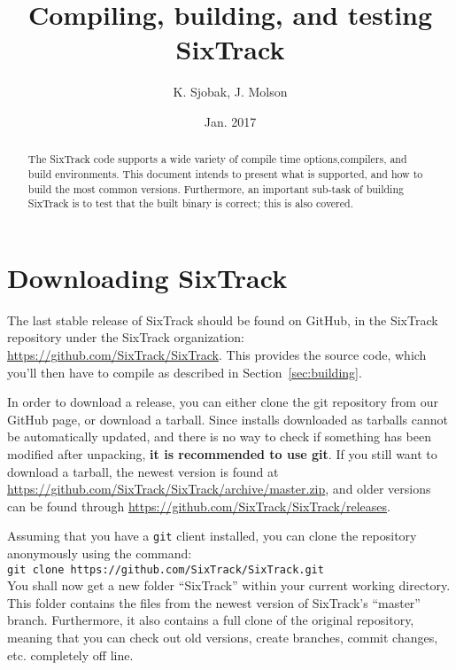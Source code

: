 \documentclass[english]{article}
\begin{document}
\author{K. Sjobak, J. Molson}
\title{Compiling, building, and testing SixTrack}
\date{Jan. 2017}

\maketitle

\begin{abstract}
  The SixTrack code supports a wide variety of compile time options,compilers, and build environments.
  This document intends to present what is supported, and how to build the most common versions.
  Furthermore, an important sub-task of building SixTrack is to test that the built binary is correct; this is also covered.
\end{abstract}

\tableofcontents
\newpage

\section{Downloading SixTrack}
The last stable release of SixTrack should be found on GitHub, in the SixTrack repository under the SixTrack organization:
\url{https://github.com/SixTrack/SixTrack}.
This provides the source code, which you'll then have to compile as described in Section~\ref{sec:building}.

In order to download a release, you can either clone the git repository from our GitHub page, or download a tarball.
Since installs downloaded as tarballs cannot be automatically updated, and there is no way to check if something has been modified after unpacking, \textbf{it is recommended to use git}.
If you still want to download a tarball, the newest version is found at\\
\url{https://github.com/SixTrack/SixTrack/archive/master.zip}, and older versions can be found through
\url{https://github.com/SixTrack/SixTrack/releases}.

Assuming that you have a \texttt{git} client installed, you can clone the repository anonymously using the command:\\
\texttt{git clone https://github.com/SixTrack/SixTrack.git}\\
You shall now get a new folder ``SixTrack'' within your current working directory.
This folder contains the files from the newest version of SixTrack's ``master'' branch.
Furthermore, it also contains a full clone of the original repository, meaning that you can check out old versions, create branches, commit changes, etc. completely off line.
\end{document}
